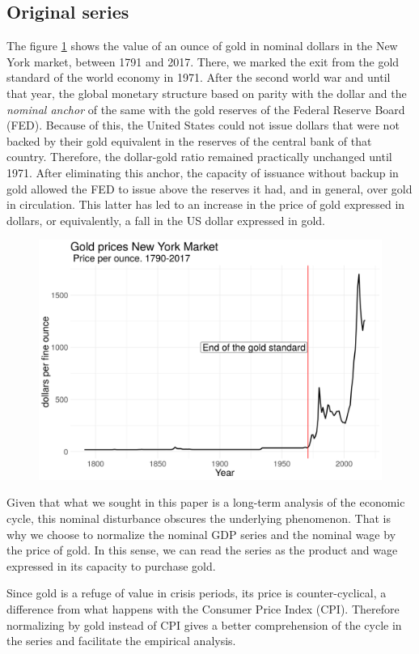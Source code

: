 \documentclass[a4paper]{article}
\begin{document}
	
	\subsection{Original series}
	
	The figure \ref{fig:oro} shows the value of an ounce of gold in nominal dollars in the New York market, between 1791 and 2017. There, we marked the exit from the gold standard of the world economy in 1971. After the second world war and until that year, the global monetary structure based on parity with the dollar and the \textit{nominal anchor} of the same with the gold reserves of the Federal Reserve Board (FED). Because of this, the United States could not issue dollars that were not backed by their gold equivalent in the reserves of the central bank of that country. Therefore, the dollar-gold ratio remained practically unchanged until 1971. After eliminating this anchor, the capacity of issuance without backup in gold allowed the FED to issue above the reserves it had, and in general, over gold in circulation. This latter has led to an increase in the price of gold expressed in dollars, or equivalently, a fall in the US dollar expressed in gold.
	
	\begin{figure}[H]
		\centering
		\includegraphics[width=0.75\linewidth]{oro_en.png}
		\caption{}\label{fig:oro}
	\end{figure}
	
	Given that what we sought in this paper is a long-term analysis of the economic cycle, this nominal disturbance obscures the underlying phenomenon. That is why we choose to normalize the nominal GDP series and the nominal wage by the price of gold. In this sense, we can read the series as the product and wage expressed in its capacity to purchase gold.
	
	
	Since gold is a refuge of value in crisis periods, its price is counter-cyclical, a difference from what happens with the Consumer Price Index (CPI). Therefore normalizing by gold instead of CPI gives a better comprehension of the cycle in the series and facilitate the empirical analysis.
	
\end{document}
